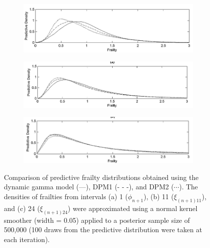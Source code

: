 \documentclass[10pt, letterpaper]{article}
\begin{document}
\begin{figure}[htbp]
    \centering
     \begin{subfigure}[b]{0.8\textwidth}
        \includegraphics[width=\textwidth]{figure4a.png} %
        \caption{}
        \label{fig:4a}
    \end{subfigure}
    \vfill
    \begin{subfigure}[b]{0.8\textwidth}
        \includegraphics[width=\textwidth]{figure4b.png} %
        \caption{}
        \label{fig:4b}
    \end{subfigure}
     \vfill
     \begin{subfigure}[b]{0.8\textwidth}
        \includegraphics[width=\textwidth]{figure4c.png} %
        \caption{}
        \label{fig:4c}
    \end{subfigure}
    \caption{Comparison of predictive frailty distributions obtained using the dynamic gamma model (---), DPM1 (- - -), and DPM2 ($\cdots$). The densities of frailties from intervals (a) 1 ($\phi_{n+1}$), (b) 11 ($\xi_{(n+1)11}$), and (c) 24 ($\xi_{(n+1)24}$) were approximated using a normal kernel smoother (width = 0.05) applied to a posterior sample size of 500,000 (100 draws from the predictive distribution were taken at each iteration).}
    \label{fig:4}
\end{figure}
\end{document}

